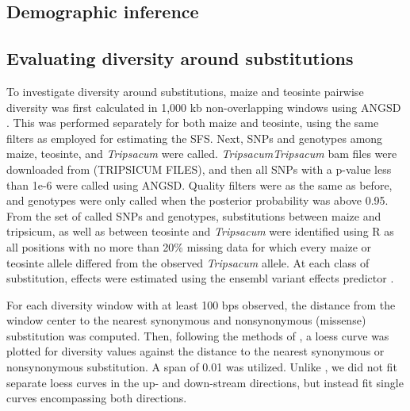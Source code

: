 \documentclass{pnastwo}
\begin{document}
\begin{article}
\begin{materials}
\subsection{Demographic inference}

\subsection{Evaluating diversity around substitutions}
To investigate diversity around substitutions, maize and teosinte pairwise diversity was first
calculated in 1,000 kb non-overlapping windows using ANGSD
\cite{korneliussen2014}. This was performed separately for both maize and
teosinte, using the same filters as employed for estimating the
SFS. Next, SNPs and genotypes among maize, teosinte, and \emph{Tripsacum} were called. \emph{Tripsacum}\emph{Tripsacum} bam files
were downloaded from \url{}(TRIPSICUM FILES), and then all SNPs with a
p-value less than 1e-6 were called using ANGSD. Quality filters were
as the same as before, and genotypes were only called when the
posterior probability was above 0.95. From the set of called SNPs and
genotypes, substitutions between maize and tripsicum, as well as
between teosinte and \emph{Tripsacum} were identified using R \cite{R2014} as all positions with
no more than 20\% missing data for which every maize or teosinte
allele differed from the observed \emph{Tripsacum} allele. At each class of
substitution, effects were estimated using the ensembl variant effects
predictor \cite{mclaren2010}.

For each diversity window with at least 100 bps observed, the distance from the window center to the
nearest synonymous and nonsynonymous (missense) substitution was
computed. Then, following the methods of \cite{hernandez2011}, a loess
curve was plotted for diversity values against the distance to the
nearest synonymous or nonsynonymous substitution. A span of 0.01 was
utilized. Unlike
\cite{sattath2011}, we did not fit separate loess curves in the up- and
down-stream directions, but instead fit single curves encompassing
both directions.


\end{materials}
\end{article}
\end{document}
